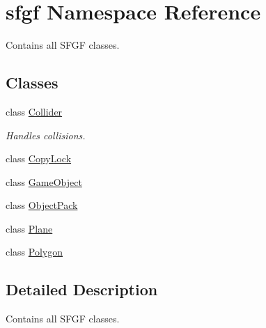 \hypertarget{namespacesfgf}{}\section{sfgf Namespace Reference}
\label{namespacesfgf}


Contains all S\+F\+GF classes.  


\subsection*{Classes}
\begin{DoxyCompactItemize}
\item 
class \hyperlink{classsfgf_1_1Collider}{Collider}
\begin{DoxyCompactList}\small\item\em Handles collisions. \end{DoxyCompactList}\item 
class \hyperlink{classsfgf_1_1CopyLock}{Copy\+Lock}
\item 
class \hyperlink{classsfgf_1_1GameObject}{Game\+Object}
\item 
class \hyperlink{classsfgf_1_1ObjectPack}{Object\+Pack}
\item 
class \hyperlink{classsfgf_1_1Plane}{Plane}
\item 
class \hyperlink{classsfgf_1_1Polygon}{Polygon}
\end{DoxyCompactItemize}


\subsection{Detailed Description}
Contains all S\+F\+GF classes. 